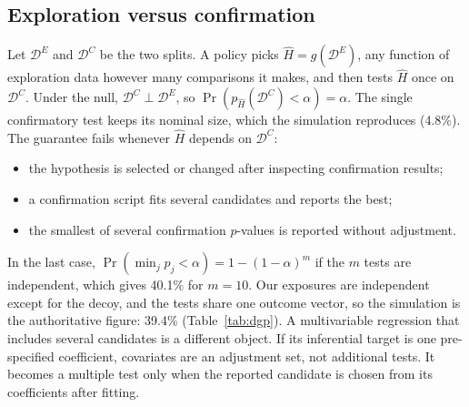 \subsection{Exploration versus confirmation}
\label{app:dgp-selection}
Let $\mathcal{D}^E$ and $\mathcal{D}^C$ be the two splits. A policy picks
$\hat H=g(\mathcal{D}^E)$, any function of exploration data however many
comparisons it makes, and then tests $\hat H$ once on $\mathcal{D}^C$. Under
the null, $\mathcal{D}^C\perp\mathcal{D}^E$, so
$\Pr(p_{\hat H}(\mathcal{D}^C)<\alpha)=\alpha$. The single confirmatory test
keeps its nominal size, which the simulation reproduces (4.8\%). The
guarantee fails whenever $\hat H$ depends on $\mathcal{D}^C$:
\begin{itemize}
\item the hypothesis is selected or changed after inspecting confirmation
results;
\item a confirmation script fits several candidates and reports the best;
\item the smallest of several confirmation $p$-values is reported without
adjustment.
\end{itemize}
In the last case,
$\Pr(\min_j p_j<\alpha)=1-(1-\alpha)^m$ if the $m$ tests are independent,
which gives 40.1\% for $m=10$. Our exposures are independent except for the
decoy, and the tests share one outcome vector, so the simulation is the
authoritative figure: 39.4\% (Table~\ref{tab:dgp}). A multivariable
regression that includes several candidates is a different object. If its
inferential target is one pre-specified coefficient, covariates are an
adjustment set, not additional tests. It becomes a multiple test only when
the reported candidate is chosen from its coefficients after fitting.

